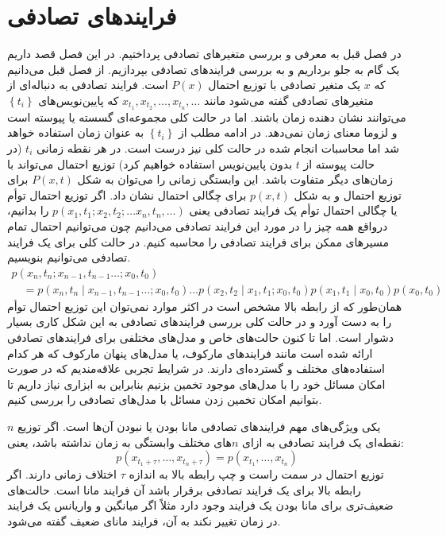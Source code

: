 \chapter{فرایندهای تصادفی}
\label{ch2}
در فصل قبل به معرفی و بررسی متغیرهای تصادفی پرداختیم. در این فصل قصد داریم یک گام به جلو برداریم و به بررسی فرایندهای تصادفی بپردازیم. از فصل قبل می‌دانیم که $x$ یک متغیر تصادفی با توزیع احتمال $P(x)$ است.
فرایند تصادفی به دنباله‌ای از متغیرهای تصادفی گفته می‌شود مانند $x_{t_1}, x_{t_2}, \dotsc, x_{t_n}, \dotsc$ که پایین‌نویس‌های $\left\{ t_{i} \right\}$ می‌توانند نشان دهنده زمان باشند. اما در حالت کلی مجموعه‌ای  گسسته یا پیوسته است و لزوما معنای زمان نمی‌دهد. در ادامه مطلب از $\left\{ t_{i} \right\}$ به عنوان زمان استفاده خواهد شد اما محاسبات انجام شده در حالت کلی نیز درست است.
در هر نقطه زمانی $t_i$ (در حالت پیوسته از $t$ بدون پایین‌نویس استفاده خواهیم کرد) توزیع احتمال می‌تواند با زمان‌های دیگر متفاوت باشد. این وابستگی زمانی را می‌توان به شکل $P(x,t)$ برای توزیع احتمال و به شکل $p(x,t)$ برای چگالی احتمال نشان داد. اگر توزیع احتمال توأم یا چگالی احتمال توأم یک فرایند تصادفی یعنی $p(x_1,t_1;x_2,t_2;\dotsc x_n,t_n,\dotsc )$ را بدانیم، درواقع همه چیز را در مورد این فرایند تصادفی می‌دانیم چون می‌توانیم احتمال تمام مسیرهای ممکن برای فرایند تصادفی را محاسبه کنیم.\cite{2007cond.mat..1242G}
در حالت کلی برای یک فرایند تصادفی می‌توانیم بنویسیم.
\begin{equation}
  \begin{array}{l}
  p(x_n,t_n; x_{n-1},t_{n-1} \dotsc ;x_{0},t_0) \\ 
  \quad = p(x_{n},t_n \mid x_{n-1},t_{n-1} \dotsc ; x_{0},t_{0}) \dotsc p(x_{2},t_{2} \mid x_{1},t_{1};x_{0},t_{0}) p(x_{1},t_{1} \mid x_{0},t_{0}) p(x_0,t_0)
  \end{array}
  \label{n_point_joint}
\end{equation}
همان‌طور که از رابطه بالا مشخص است در اکثر موارد نمی‌توان این توزیع احتمال توأم را به دست آورد و در حالت کلی بررسی فرایندهای تصادفی به این  شکل کاری بسیار دشوار است. اما تا کنون حالت‌های خاص و مدل‌های مختلفی برای فرایندهای تصادفی ارائه شده است مانند فرایندهای مارکوف، یا مدل‌های پنهان مارکوف که هر کدام استفاده‌های مختلف و گسترده‌ای دارند. در شرایط تجربی علاقه‌مندیم که در صورت امکان مسائل خود را با مدل‌های موجود تخمین بزنیم بنابراین به ابزاری نیاز داریم تا بتوانیم امکان تخمین زدن مسائل با مدل‌های تصادفی را بررسی کنیم.

یکی ویژگی‌های مهم فرایندهای تصادفی مانا بودن یا نبودن آن‌ها است. اگر توزیع $n$ نقطه‌ای یک فرایند تصادفی به ازای $n$های مختلف وابستگی به زمان نداشته باشد، یعنی:
\begin{equation}
    p\left(x_{t_{1}+\tau}, \ldots, x_{t_{n}+\tau}\right)=p\left(x_{t_{1}}, \ldots, x_{t_{n}}\right)
\end{equation}
توزیع احتمال در سمت راست و چپ رابطه بالا به اندازه $\tau$ اختلاف زمانی دارند. اگر رابطه بالا برای یک فرایند تصادفی برقرار باشد آن فرایند مانا است. حالت‌های ضعیف‌تری برای مانا بودن یک فرایند وجود دارد مثلاً اگر میانگین و واریانس یک فرایند در زمان تغییر نکند به آن، فرایند مانای ضعیف گفته می‌شود.\cite{2007cond.mat..1242G}

